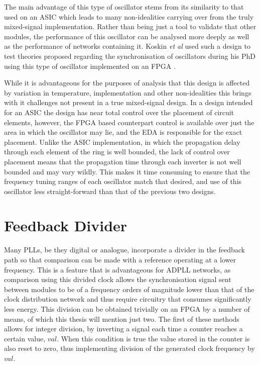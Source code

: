 The main advantage of this type of oscillator stems from its similarity to that used on an \ac{ASIC} which leads to many non-idealities carrying over from the truly mixed-signal implementation. Rather than being just a tool to validate that other modules, the performance of this oscillator can be analysed more deeply as well as the performance of networks containing it. Koskin \textit{et al} used such a design to test theories proposed regarding the synchronisation of oscillators during his PhD using this type of oscillator implemented on an \ac{FPGA} \cite{koskin2019phd,theboys2019}.

While it is advantageous for the purposes of analysis that this design is affected by variation in temperature, implementation and other non-idealities this brings with it challenges not present in a true mixed-signal design. In a design intended for an \ac{ASIC} the design has near total control over the placement of circuit elements, however, the \ac{FPGA} based counterpart control is available over just the area in which the oscillator may lie, and the \ac{EDA} is responsible for the exact placement. Unlike the \ac{ASIC} implementation, in which the propagation delay through each element of the ring is well bounded, the lack of control over placement means that the propagation time through each inverter is not well bounded and may vary wildly. This makes it time consuming to ensure that the frequency tuning ranges of each oscillator match that desired, and use of this oscillator less straight-forward than that of the previous two designs.

\section{Feedback Divider}
Many \ac{PLL}s, be they digital or analogue, incorporate a divider in the feedback path so that comparison can be made with a reference operating at a lower frequency. This is a feature that is advantageous for \ac{ADPLL} networks, as comparison using this divided clock allows the synchronisation signal sent between modules to be of a frequency orders of magnitude lower than that of the clock distribution network and thus require circuitry that consumes significantly less energy. This division can be obtained trivially on an \ac{FPGA} by a number of means, of which this thesis will mention just two. The first of these methods allows for integer division, by inverting a signal each time a counter reaches a certain value, $val$. When this condition is true the value stored in the counter is also reset to zero, thus implementing division of the generated clock frequency by $val$.

